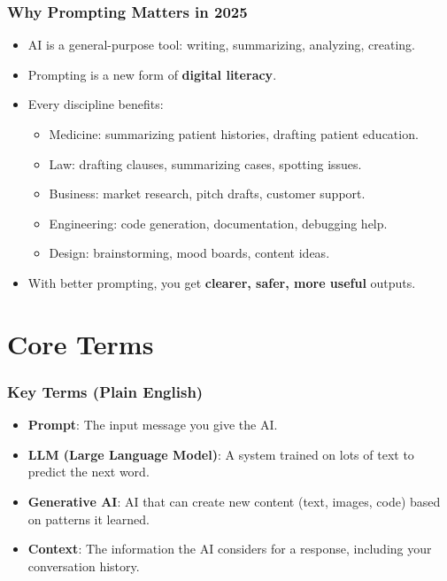 \documentclass[11pt]{beamer}
\begin{document}
\begin{frame}
  \frametitle{Why Prompting Matters in 2025}
  \begin{itemize}
    \item AI is a general-purpose tool: writing, summarizing, analyzing, creating.
    \item Prompting is a new form of \textbf{digital literacy}.
    \item Every discipline benefits:
    \begin{itemize}
      \item Medicine: summarizing patient histories, drafting patient education.
      \item Law: drafting clauses, summarizing cases, spotting issues.
      \item Business: market research, pitch drafts, customer support.
      \item Engineering: code generation, documentation, debugging help.
      \item Design: brainstorming, mood boards, content ideas.
    \end{itemize}
    \item With better prompting, you get \textbf{clearer, safer, more useful} outputs.
  \end{itemize}
\end{frame}

\section{Core Terms}
\begin{frame}
  \frametitle{Key Terms (Plain English)}
  \begin{itemize}
    \item \textbf{Prompt}: The input message you give the AI.
    \item \textbf{LLM (Large Language Model)}: A system trained on lots of text to predict the next word.
    \item \textbf{Generative AI}: AI that can create new content (text, images, code) based on patterns it learned.
    \item \textbf{Context}: The information the AI considers for a response, including your conversation history.
  \end{itemize}
\end{frame}

\end{document}
